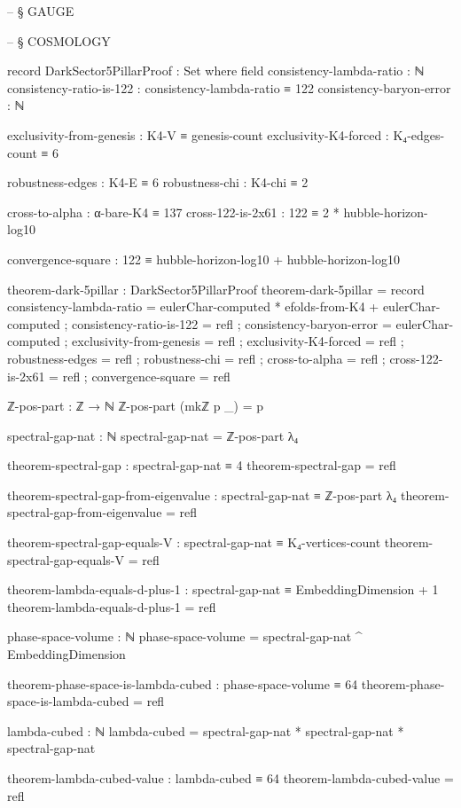 \documentclass[11pt,a4paper]{book}
\begin{document}
\begin{code}
-- § GAUGE



-- § COSMOLOGY

record DarkSector5PillarProof : Set where
  field
    consistency-lambda-ratio : ℕ
    consistency-ratio-is-122 : consistency-lambda-ratio ≡ 122
    consistency-baryon-error : ℕ
    
    exclusivity-from-genesis : K4-V ≡ genesis-count
    exclusivity-K4-forced : K₄-edges-count ≡ 6
    
    robustness-edges : K4-E ≡ 6
    robustness-chi : K4-chi ≡ 2
    
    cross-to-alpha : α-bare-K4 ≡ 137
    cross-122-is-2x61 : 122 ≡ 2 * hubble-horizon-log10
    
    convergence-square : 122 ≡ hubble-horizon-log10 + hubble-horizon-log10

theorem-dark-5pillar : DarkSector5PillarProof
theorem-dark-5pillar = record
  { consistency-lambda-ratio = eulerChar-computed * efolds-from-K4 + eulerChar-computed
  ; consistency-ratio-is-122 = refl
  ; consistency-baryon-error = eulerChar-computed
  ; exclusivity-from-genesis = refl
  ; exclusivity-K4-forced = refl
  ; robustness-edges = refl
  ; robustness-chi = refl
  ; cross-to-alpha = refl
  ; cross-122-is-2x61 = refl
  ; convergence-square = refl
  }

ℤ-pos-part : ℤ → ℕ
ℤ-pos-part (mkℤ p _) = p

spectral-gap-nat : ℕ
spectral-gap-nat = ℤ-pos-part λ₄

theorem-spectral-gap : spectral-gap-nat ≡ 4
theorem-spectral-gap = refl

theorem-spectral-gap-from-eigenvalue : spectral-gap-nat ≡ ℤ-pos-part λ₄
theorem-spectral-gap-from-eigenvalue = refl

theorem-spectral-gap-equals-V : spectral-gap-nat ≡ K₄-vertices-count
theorem-spectral-gap-equals-V = refl

theorem-lambda-equals-d-plus-1 : spectral-gap-nat ≡ EmbeddingDimension + 1
theorem-lambda-equals-d-plus-1 = refl



phase-space-volume : ℕ
phase-space-volume = spectral-gap-nat ^ EmbeddingDimension

theorem-phase-space-is-lambda-cubed : phase-space-volume ≡ 64
theorem-phase-space-is-lambda-cubed = refl

lambda-cubed : ℕ
lambda-cubed = spectral-gap-nat * spectral-gap-nat * spectral-gap-nat

theorem-lambda-cubed-value : lambda-cubed ≡ 64
theorem-lambda-cubed-value = refl


\end{code}
\end{document}
